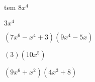 \documentclass{article}
\begin{document}
\begin{multicols}{2}
tem $8x^{4}$\item $3x^{4}$\item $(7x^{6}-x^{4}+3)(9x^{4}-5x)$\item $(3)(10x^{5})$\item $(9x^{6}+x^2)(4x^{3}+8)$\ite
\end{multicols}
\end{document}
